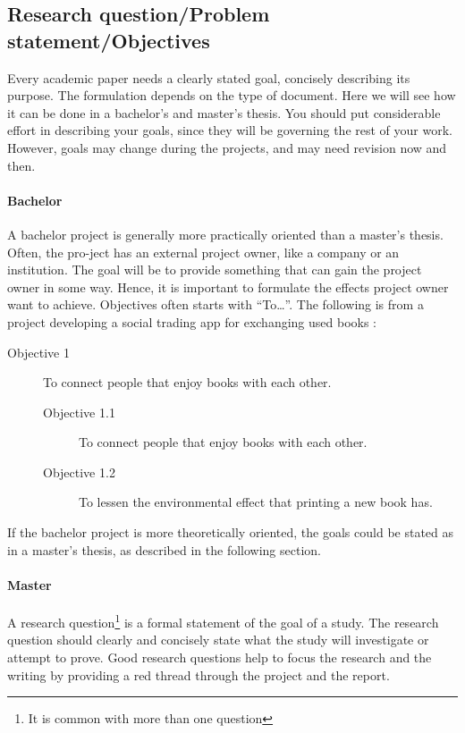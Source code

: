 \lipsum[11-14]


\subsection{Research question/Problem statement/Objectives}
\label{sec:research-question}

Every academic paper needs a clearly stated goal, concisely describing its purpose. The formulation depends on the type of document. Here we will see how it can be done in a bachelor’s and master’s thesis. You should put considerable effort in describing your goals, since they will be governing the rest of your work. However, goals may change during the projects, and may need revision now and then.

\paragraph{Bachelor}

A bachelor project is generally more practically oriented than a master’s thesis. Often, the pro-ject has an external project owner, like a company or an institution. The goal will be to provide something that can gain the project owner in some way. Hence, it is important to formulate the effects project owner want to achieve. Objectives often starts with “To\dots”.
The following is from a project developing a social trading app for exchanging used books  \parencite{akeriversen20bah}:

\begin{description}
\item [Objective 1] To connect people that enjoy books with each other.
    \begin{description}
    \item [Objective 1.1] To connect people that enjoy books with each other.
    \item [Objective 1.2] To lessen the environmental effect that printing a new book has.
    \end{description}
\end{description}

If the bachelor project is more theoretically oriented, the goals could be stated as in a master’s thesis, as described in the following section.

\paragraph{Master}

A research question\footnote{It is common with more than one question} is a formal statement of the goal of a study. The research question should clearly and concisely state what the study will investigate or attempt to prove. 
Good research questions help to focus the research and the writing by providing a red thread through the project and the report. 

